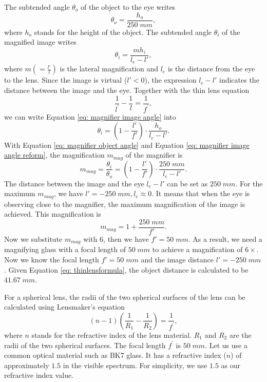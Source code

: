 The subtended angle $\theta_o$ of the object to the eye writes 
\begin{equation}
\label{eq: magnifier object angle}
\theta_o = \frac{h_o}{250 \; mm},
\end{equation}where $h_o$ stands for the height of the object.
The subtended angle $\theta_i$ of  the magnified image writes
\begin{equation}
\label{eq: magnifier image angle}
\theta_i = \frac{mh_i}{l_e-l'},
\end{equation}where $m (= \frac{l'}{l})$ is the lateral magnification and $l_e$ is  the distance from the eye to the lens. Since the image is virtual ($l'<0$), the expression $l_e - l'$ indicates the distance between the image and the eye. Together with the thin lens equation 
\begin{equation} \label{eq: thinlensformula}
    \frac{1}{l^\prime} - \frac{1}{l} = \frac{1}{f^\prime},
\end{equation}we can write Equation \ref{eq: magnifier image angle} into
\begin{equation}
\label{eq: magnifier image angle reform}
\theta_i = (1-\frac{l'}{f'})\cdot\frac{h_o}{l_e-l'}.
\end{equation}With Equation \ref{eq: magnifier object angle} and Equation \ref{eq: magnifier image angle reform}, the magnification $m_{mag}$ of the magnifier is 
\begin{equation}
\label{eq: magnifier magnification}
m_{mag} = \frac{\theta_i}{\theta_o} = (1-\frac{l'}{f'})\cdot\frac{250 \; mm}{l_e-l'}.
\end{equation}The distance between the image and the eye $l_e-l'$ can be set as $250 \;mm$. For the maximum $m_{mag}$, we have $l' = -250 \; mm, l_e \approx 0$. It means that when the eye is observing close to the magnifier, the maximum magnification of the image is achieved. This magnification is
\begin{equation}
\label{eq: magnifier magnification simplified}
m_{mag}  = 1+\frac{250 \; mm}{f'}.
\end{equation}Now we substitute $m_{mag}$ with $6$, then we have $f' = 50 \; mm$. As a result, we need a magnifying glass with a focal length of $50 \;mm$ to achieve a magnification of  $6\times$.
Now we know the focal length  $f' = 50 \; mm$ and the image distance $l' = -250 \; mm$. Given Equation \ref{eq: thinlensformula}, the object distance is calculated to be $41.67 \;mm$.  

For a spherical lens, the radii of the two spherical surfaces of the lens can be calculated using Lensmaker's equation 
\begin{equation} \label{eq: lensmaker_r}
    (n-1)(\frac{1}{R_1} - \frac{1}{R_2}) = \frac{1}{f^\prime},
\end{equation}
where $n$ stands for the refractive index of the lens material. $R_1$ and $R_2$ are the radii of the two spherical surfaces. The focal length $f^\prime$ is $50 \; mm$. Let us use a common optical material such as BK7 glass. It has a refractive index ($n$) of approximately $1.5$ in the visible spectrum. For simplicity, we use $1.5$ as our refractive index value.

